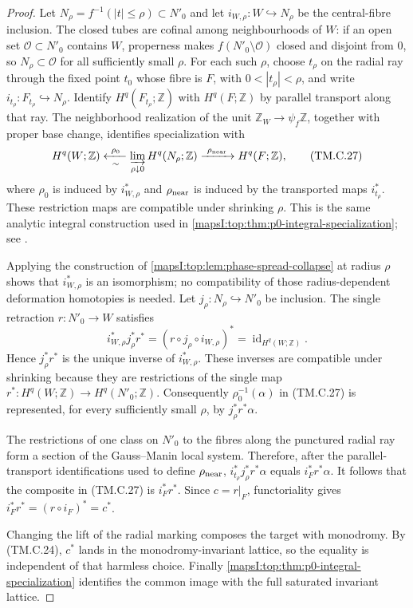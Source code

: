 \begin{proof}
Let $N_\rho=f^{-1}(|t|\leq\rho)\subset N'_0$ and let
$i_{W,\rho}:W\hookrightarrow N_\rho$ be the central-fibre inclusion.  The
closed tubes are cofinal among neighbourhoods of $W$: if an open set
$\mathcal O\subset N'_0$ contains $W$, properness makes
$f(N'_0\setminus\mathcal O)$ closed and disjoint from $0$, so
$N_\rho\subset\mathcal O$ for all sufficiently small $\rho$.  For each such
$\rho$, choose $t_\rho$ on the radial ray through the fixed point $t_0$ whose
fibre is $F$, with $0<|t_\rho|<\rho$, and write
$i_{t_\rho}:F_{t_\rho}\hookrightarrow N_\rho$.  Identify
$H^q(F_{t_\rho};\mathbb Z)$ with $H^q(F;\mathbb Z)$ by parallel transport
along that ray.  The neighborhood realization of the unit
$\mathbb Z_W\to\psi_f\mathbb Z$, together with proper base change, identifies
specialization with
\[
 H^q(W;\mathbb Z)
 \xleftarrow[\sim]{\ \rho_0\ }
 \varinjlim_{\rho\downarrow0}H^q(N_\rho;\mathbb Z)
 \xrightarrow{\ \rho_{\rm near}\ }H^q(F;\mathbb Z),
\tag{TM.C.27}
\]
where $\rho_0$ is induced by $i_{W,\rho}^*$ and $\rho_{\rm near}$ is induced
by the transported maps $i_{t_\rho}^*$.  These restriction maps are compatible
under shrinking $\rho$.  This is the same analytic integral
construction used in
\cref{mapsI:top:thm:p0-integral-specialization}; see
\cite[Definition~4.2.1 and Propositions~4.2.2, 4.2.11]{Dimca2004}.

Applying the construction of \cref{mapsI:top:lem:phase-spread-collapse} at radius
$\rho$ shows that $i_{W,\rho}^*$ is an isomorphism; no compatibility of those
radius-dependent deformation homotopies is needed.  Let
$j_\rho:N_\rho\hookrightarrow N'_0$ be inclusion.  The single retraction
$r:N'_0\to W$ satisfies
\[
 i_{W,\rho}^*j_\rho^*r^*
 =(r\circ j_\rho\circ i_{W,\rho})^*
 =\operatorname{id}_{H^q(W;\mathbb Z)}.
\]
Hence $j_\rho^*r^*$ is the unique inverse of $i_{W,\rho}^*$.  These inverses
are compatible under shrinking because they are restrictions of the single
map $r^*:H^q(W;\mathbb Z)\to H^q(N'_0;\mathbb Z)$.  Consequently
$\rho_0^{-1}(\alpha)$ in (TM.C.27) is represented, for every sufficiently small
$\rho$, by $j_\rho^*r^*\alpha$.

The restrictions of one class on $N'_0$ to the fibres along the punctured
radial ray form a section of the Gauss--Manin local system.  Therefore, after
the parallel-transport identifications used to define $\rho_{\rm near}$,
$i_{t_\rho}^*j_\rho^*r^*\alpha$ equals $i_F^*r^*\alpha$.  It follows that the
composite in
(TM.C.27) is $i_F^*r^*$.  Since $c=r|_F$, functoriality gives
$i_F^*r^*=(r\circ i_F)^*=c^*$.

Changing the lift of the radial marking composes the target with monodromy.
By (TM.C.24), $c^*$ lands in the monodromy-invariant lattice, so the equality is
independent of that harmless choice.  Finally
\cref{mapsI:top:thm:p0-integral-specialization} identifies the common image with the
full saturated invariant lattice.
\end{proof}

